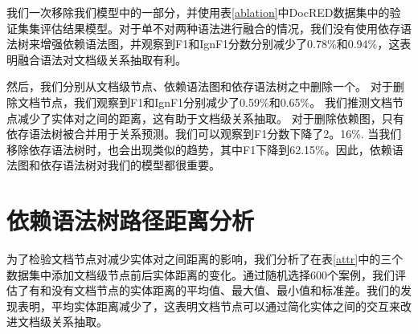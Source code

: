 \documentclass[bachelor]{thesis-uestc}
\begin{document}
我们一次移除我们模型中的一部分，并使用表\ref{ablation}中DocRED数据集中的验证集集评估结果模型。对于单不对两种语法进行融合的情况，我们没有使用依存语法树来增强依赖语法图，并观察到F1和IgnF1分数分别减少了0.78\%和0.94\%，这表明融合语法对文档级关系抽取有利。\par
然后，我们分别从文档级节点、依赖语法图和依存语法树之中删除一个。
对于删除文档节点，我们观察到F1和IgnF1分别减少了0.59\%和0.65\%。
我们推测文档节点减少了实体对之间的距离，这有助于文档级关系抽取。
对于删除依赖图，只有依存语法树被合并用于关系预测。我们可以观察到F1分数下降了2。16\%. 当我们移除依存语法树时，也会出现类似的趋势，其中F1下降到62.15\%。因此，依赖语法图和依存语法树对我们的模型都很重要。\par

\section{依赖语法树路径距离分析}\label{sec:distance}
\begin{table}
    \caption{DocRED、CDR、GDA数据集中具有文档节点和不具有文档节点的实体距离的平均/最大/最小长度和标准差}
\end{table}\label{attr}

为了检验文档节点对减少实体对之间距离的影响，我们分析了在表\ref{attr}中的三个数据集中添加文档级节点前后实体距离的变化。通过随机选择600个案例，我们评估了有和没有文档节点的实体距离的平均值、最大值、最小值和标准差。我们的发现表明，平均实体距离减少了，这表明文档节点可以通过简化实体之间的交互来改进文档级关系抽取。
\end{document}

